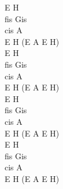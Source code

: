 \documentclass[a5paper, 10pt]{book}
\begin{document}
\begin{minipage}[t]{0.2\textwidth}
  E H\\
  fis Gis\\
  cis A\\
  E H (E A E H)\\

  E H\\
  fis Gis\\
  cis A\\
  E H (E A E H)\\

  E H\\
  fis Gis\\
  cis A\\
  E H (E A E H)\\

  E H\\
  fis Gis\\
  cis A\\
  E H (E A E H)\\
\end{minipage}

\newpage
\end{document}
